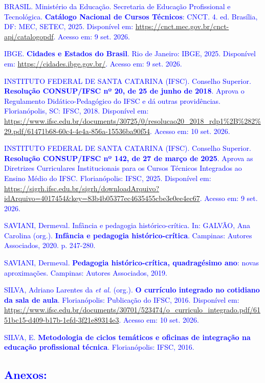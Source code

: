 \documentclass{../../modelos/latex-shared/ifsc-ppc}
\newcommand{\revisao}[1]{\textcolor{blue}{#1}}
\newcommand{\revisao}[1]{#1}
\begin{document}
{\revisao{BRASIL. Ministério da Educação. Secretaria de Educação Profissional e Tecnológica. \textbf{Catálogo Nacional de Cursos Técnicos}: CNCT. 4. ed. Brasília, DF: MEC, SETEC, 2025. Disponível em: \url{https://cnct.mec.gov.br/cnct-api/catalogopdf}. Acesso em: 9 set. 2026.}

\revisao{IBGE. \textbf{Cidades e Estados do Brasil}. Rio de Janeiro: IBGE, 2025. Disponível em: \url{https://cidades.ibge.gov.br/}. Acesso em: 9 set. 2026.}

\revisao{INSTITUTO FEDERAL DE SANTA CATARINA (IFSC). Conselho Superior. \textbf{Resolução CONSUP/IFSC nº 20, de 25 de junho de 2018}. Aprova o Regulamento Didático-Pedagógico do IFSC e dá outras providências. Florianópolis, SC: IFSC, 2018. Disponível em: \url{https://www.ifsc.edu.br/documents/30725/0/resolucao20_2018_rdp1\%2B\%282\%29.pdf/61471b68-60c4-4e4a-856a-15536ba90f54}. Acesso em: 10 set. 2026.}

\revisao{INSTITUTO FEDERAL DE SANTA CATARINA (IFSC). Conselho Superior. \textbf{Resolução CONSUP/IFSC nº 142, de 27 de março de 2025}. Aprova as Diretrizes Curriculares Institucionais para os Cursos Técnicos Integrados ao Ensino Médio do IFSC. Florianópolis: IFSC, 2025. Disponível em: \url{https://sigrh.ifsc.edu.br/sigrh/downloadArquivo?idArquivo=4017454&key=83b4b05377ec4635455cbe3e0ee4ec67}. Acesso em: 9 set. 2026.}

\revisao{SAVIANI, Dermeval. Infância e pedagogia histórico-crítica. In: GALVÃO, Ana Carolina (org.). \textbf{Infância e pedagogia histórico-crítica}. Campinas: Autores Associados, 2020. p. 247-280.}

\revisao{SAVIANI, Dermeval. \textbf{Pedagogia histórico-crítica, quadragésimo ano}: novas aproximações. Campinas: Autores Associados, 2019.}

\revisao{SILVA, Adriano Larentes da \textit{et al.} (org.). \textbf{O currículo integrado no cotidiano da sala de aula}. Florianópolis: Publicação do IFSC, 2016. Disponível em: \url{https://www.ifsc.edu.br/documents/30701/523474/o_curriculo_integrado.pdf/6151bc15-d409-b17b-1efd-3f21e89314e3}. Acesso em: 10 set. 2026.}

\revisao{SILVA, E. \textbf{Metodologia de ciclos temáticos e oficinas de integração na educação profissional técnica}. Florianópolis: IFSC, 2016.}
\par}

\subsection{\revisao{Anexos:}}
\end{document}
